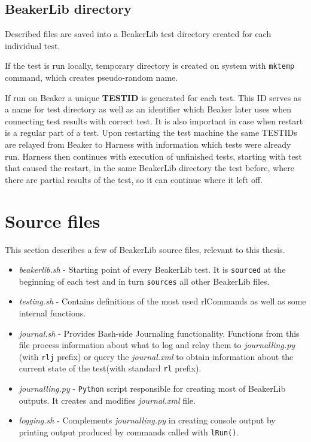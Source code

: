 \subsection{BeakerLib directory}
\label{beakerlib_dir}
Described files are saved into a BeakerLib test directory created for each individual test. 

If the test is run locally, temporary directory is created on system with \texttt{mktemp} command, which creates pseudo-random name.

If run on Beaker a unique \textbf{TESTID} is generated for each test. This ID serves as a name for test directory as well as an identifier which Beaker later uses when connecting test results with correct test. It is also important in case when restart is a regular part of a test. Upon restarting the test machine the same TESTIDs are relayed from Beaker to Harness with information which tests were already run. Harness then continues with execution of unfinished tests, starting with test that caused the restart, in the same BeakerLib directory the test before, where there are partial results of the test, so it can continue where it left off.

\section{Source files}
This section describes a few of BeakerLib source files, relevant to this thesis.
\begin{itemize}
\item \textit{beakerlib.sh} - Starting point of every BeakerLib test. It is \texttt{sourced} at the beginning of each test and in turn \texttt{sources} all other BeakerLib files.
\item \textit{testing.sh} - Contains definitions of the most used rlCommands as well as some internal functions.
\item \textit{journal.sh} - Provides Bash-side Journaling functionality. Functions from this file process information about what to log and relay them to \textit{journalling.py} (with \texttt{rlj} prefix) or query the \textit{journal.xml} to obtain information about the current state of the test(with standard \texttt{rl} prefix).
\item \textit{journalling.py} - \texttt{Python} script responsible for creating most of BeakerLib outputs. It creates and modifies \textit{journal.xml} file.
\item \textit{logging.sh} - Complements \textit{journalling.py} in creating console output by printing output produced by commands called with \texttt{lRun()}.
\end{itemize}

